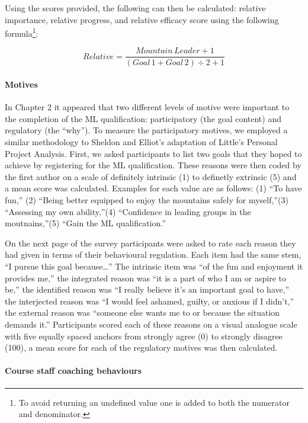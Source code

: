 \documentclass[a4paper,]{book}
\let\oldparagraph\paragraph
\renewcommand{\paragraph}[1]{\oldparagraph{#1}\mbox{}}
\begin{document}
Using the scores provided, the following can then be calculated: relative importance, relative progress, and relative efficacy score using the following formula\footnote{To avoid returning an undefined value one is added to both the numerator and denominator.}:

\[
Relative = \frac{Mountain\,Leader + 1 }{(Goal\,1 + Goal\,2) \div 2 + 1}
\]

\hypertarget{motives}{%
\paragraph{Motives}\label{motives}}

In Chapter 2 it appeared that two different levels of motive were important to the completion of the ML qualification: participatory (the goal content) and regulatory (the ``why''). To measure the participatory motives, we employed a similar methodology to Sheldon and Elliot's \citeyearpar{Sheldon1999} adaptation of Little's \citeyearpar{Little1983} Personal Project Analysis. First, we asked participants to list two goals that they hoped to achieve by registering for the ML qualification. These reasons were then coded by the first author on a scale of definitely intrinsic (1) to definetly extrinsic (5) and a mean score was calculated. Examples for each value are as follows: (1) ``To have fun,'' (2) ``Being better equipped to enjoy the mountains safely for myself,''(3) ``Assessing my own ability,''(4) ``Confidence in leading groups in the moutnains,''(5) ``Gain the ML qualification.''

On the next page of the survey participants were asked to rate each reason they had given in terms of their behavioural regulation. Each item had the same stem, ``I pursue this goal because\ldots{}'' The intrinsic item was ``of the fun and enjoyment it provides me,'' the integrated reason was ``it is a part of who I am or aspire to be,'' the identified reason was ``I really believe it's an important goal to have,'' the interjected reason was ``I would feel ashamed, guilty, or anxious if I didn't,'' the external reason was ``someone else wants me to or because the situation demands it.'' Participants scored each of these reasons on a visual analogue scale with five equally spaced anchors from strongly agree (0) to strongly disagree (100), a mean score for each of the regulatory motives was then calculated.

\hypertarget{course-staff-coaching-behaviours}{%
\paragraph{Course staff coaching behaviours}\label{course-staff-coaching-behaviours}}
\end{document}
